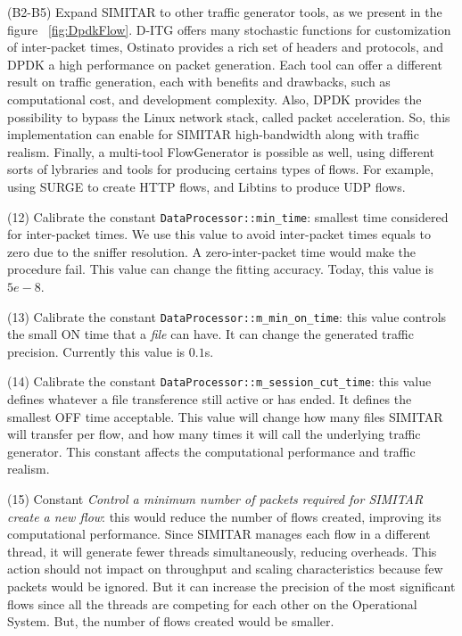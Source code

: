(B2-B5) Expand SIMITAR to other traffic generator tools, as we present in the figure ~\ref{fig:DpdkFlow}. D-ITG offers many stochastic functions for customization of inter-packet times, Ostinato provides a rich set of headers and protocols, and DPDK a high performance on packet generation. Each tool can offer a different result on traffic generation, each with benefits and drawbacks, such as computational cost, and development complexity.  Also, DPDK provides the possibility to bypass the Linux network stack, called packet acceleration. So, this implementation can enable for SIMITAR high-bandwidth along with traffic realism. Finally, a multi-tool FlowGenerator is possible as well, using different sorts of lybraries and tools for producing certains types of flows. For example, using SURGE\cite{surge-paper} to create HTTP flows, and Libtins to produce UDP flows. 


(12) Calibrate  the constant  \texttt{DataProcessor::min\_time}: smallest time considered for inter-packet times. We use this value to avoid inter-packet times equals to zero due to the sniffer resolution. A zero-inter-packet time would make the procedure fail.  This value can change the fitting accuracy. Today, this value is $5e-8$.


(13) Calibrate  the constant \texttt{DataProcessor::m\_min\_on\_time}: this value controls the small ON time that a \textit{file} can have. It can change the generated traffic precision. Currently this value is $0.1$s. 


(14) Calibrate  the constant \texttt{DataProcessor::m\_session\_cut\_time}: this value defines whatever a file transference still active or has ended. It defines the smallest OFF time acceptable. This value will change how many files SIMITAR will transfer per flow, and how many times it will call the underlying traffic generator. This constant affects the computational performance and traffic realism.


(15) Constant \textit{Control a minimum number of packets required for SIMITAR create a new flow}: this would reduce the number of flows created, improving its computational performance. Since SIMITAR manages each flow in a different thread, it will generate fewer threads simultaneously, reducing overheads. This action should not impact on throughput and scaling characteristics because few packets would be ignored. But it can increase the precision of the most significant flows since all the threads are competing for each other on the Operational System. But, the number of flows created would be smaller.


